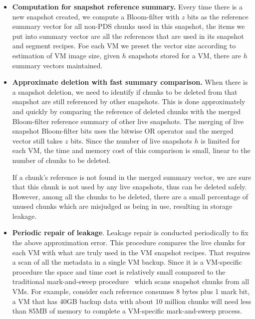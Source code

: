 \begin{itemize}
\item {\bf Computation for snapshot reference summary.}
Every time there is a new snapshot created,
we compute a Bloom-filter with $z$ bits as the reference summary vector for all non-PDS chunks used 
in this snapshot,
the items we put into summary vector are all the references that are used in its snapshot and segment recipes.
Foe each VM we preset the vector size according to  estimation of VM image size,
given $h$ snapshots stored for a VM, there are $h$ summary vectors maintained.

\item {\bf Approximate deletion with fast summary comparison.}
When there is a snapshot deletion,  
we need to identify if  chunks to be deleted from that snapshot
are still referenced by other snapshots. 
This is done approximately and quickly by comparing the 
reference of deleted chunks  with
the merged Bloom-filter reference summary of other live snapshots.
The merging of live snapshot Bloom-filter bits uses the bitwise OR operator 
and the merged vector still takes $z$ bits.
Since the number of live snapshots $h$ is limited for
each VM, 
the time and memory cost of this comparison is small, linear to the number of chunks to be deleted.

If a chunk's reference is not found in the merged summary vector, we are sure that
this chunk is not used by any live snapshots, thus can be deleted safely.
However, among all the chunks to be deleted, 
there are a small percentage of unused chunks  which
are misjudged as  being in use, resulting in storage leakage.

\item {\bf Periodic repair of leakage}.
Leakage repair is conducted periodically to fix the above approximation error.
This procedure compares the live chunks for each VM with what are truly used in the VM snapshot recipes.
That requires a scan of all the metadata in a single VM backup. Since it is a VM-specific procedure 
the space and time cost is relatively small compared to the traditional mark-and-sweep procedure~\cite{Guo2011} which scans snapshot 
chunks from all VMs.
For example,
consider each reference consumes 8 bytes plus  1 mark bit, a VM that has 40GB backup data with about
10 million chunks will need less than 85MB of memory to complete a VM-specific mark-and-sweep process.
\end{itemize}


